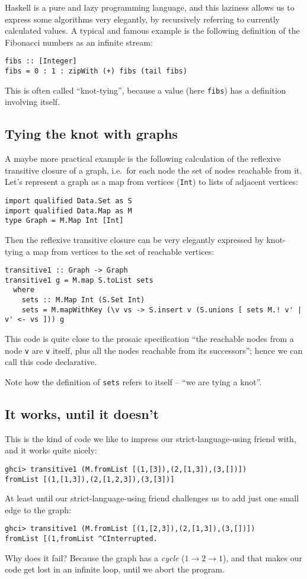 \documentclass[manuscript,screen,acmsmall]{acmart}
\begin{document}
Haskell is a pure and lazy programming language, and this laziness allows us to express some algorithms very elegantly, by recursively referring to currently calculated values. A typical and famous example is the following definition of the Fibonacci numbers as an infinite stream:
\begin{verbatim}
fibs :: [Integer]
fibs = 0 : 1 : zipWith (+) fibs (tail fibs)
\end{verbatim}
This is often called “knot-tying”, because a value (here \verb|fibs|) has a definition involving itself.

\subsection{Tying the knot with graphs}

A maybe more practical example is the following calculation of the reflexive transitive closure of a graph, i.e.\ for each node the set of nodes reachable from it. Let's represent a graph as a map from vertices (\verb|Int|) to lists of adjacent vertices:
\begin{verbatim}
import qualified Data.Set as S
import qualified Data.Map as M
type Graph = M.Map Int [Int]
\end{verbatim}

Then the reflexive transitive closure can be very elegantly expressed by knot-tying a map from vertices to the set of reachable vertices:
\begin{verbatim}
transitive1 :: Graph -> Graph
transitive1 g = M.map S.toList sets
  where
    sets :: M.Map Int (S.Set Int)
    sets = M.mapWithKey (\v vs -> S.insert v (S.unions [ sets M.! v' | v' <- vs ])) g
\end{verbatim}
This code is quite close to the prosaic specification “the reachable nodes from a node \verb|v| are \verb|v| itself, plus all the nodes reachable from its successors”; hence we can call this code declarative.

Note how the definition of \verb|sets| refers to itself -- “we are tying a knot”.

\subsection{It works, until it doesn't}

This is the kind of code we like to impress our strict-language-using friend with, and it works quite nicely:
\begin{verbatim}
ghci> transitive1 (M.fromList [(1,[3]),(2,[1,3]),(3,[])])
fromList [(1,[1,3]),(2,[1,2,3]),(3,[3])]
\end{verbatim}
%
At least until our strict-language-using friend challenges us to add just one small edge to the graph:
\begin{verbatim}
ghci> transitive1 (M.fromList [(1,[2,3]),(2,[1,3]),(3,[])])
fromList [(1,fromList ^CInterrupted.
\end{verbatim}
Why does it fail? Because the graph has a \emph{cycle} ($1 \to 2 \to 1$), and that makes our code get lost in an infinite loop, until we abort the program.
\end{document}
